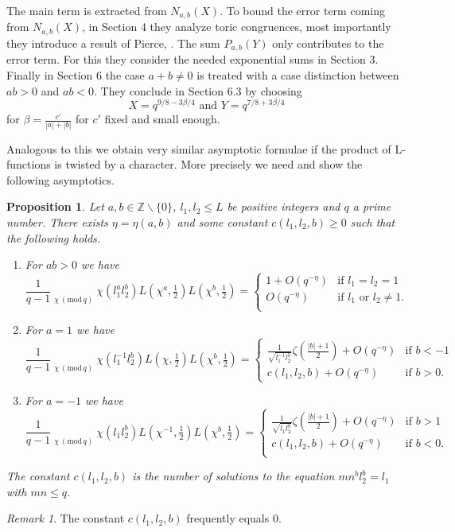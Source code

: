 \documentclass[12pt]{amsart}
\theoremstyle{plain}
\newtheorem{prop}[thm]{Proposition}
\theoremstyle{definition}
\theoremstyle{remark}
\newtheorem{rem}[thm]{Remark}
\numberwithin{equation}{section}
\newcommand{\ZZ}{\mathbb{Z}}
\newcommand\sumst{\mathop{{\sum}^\ast}\limits}
\newcommand{\mods}[1]{\,(\mathrm{mod}\,{#1})}
\renewcommand{\geq}{\geqslant}
\renewcommand{\leq}{\leqslant}
\begin{document}
The main term is extracted from $N_{a,b}(X)$. To bound the error term coming from $N_{a,b}(X)$, in Section 4 they analyze toric congruences, most importantly they introduce a result of Pierce, \cite{Pierce1}. The sum $P_{a,b}(Y)$ only contributes to the error term. For this they consider the needed exponential sums in Section 3. Finally in Section 6 the case $a+b\neq 0$ is treated with a case distinction between $ab>0$ and $ab<0$. They conclude in Section 6.3 by choosing \begin{equation}\label{eq: choice X and Y in fkm}
X=q^{9/8-3\beta/4} \text{ and }Y=q^{7/8+3\beta/4}\end{equation} 
for $\beta=\frac{c'}{|a|+|b|}$ for $c'$ fixed and small enough. 


Analogous to this we obtain very similar asymptotic formulae if the product of L-functions is twisted by a character. More precisely we need and show the following asymptotics.

\begin{prop}\label{prop: Adaptation of second moment k=0}
Let $a,b\in \ZZ\smallsetminus\{0\}$, $l_1,l_2\leq L$ be positive integers and $q$ a prime number. There exists $\eta=\eta(a,b)$ and some constant $ c(l_1,l_2,b)\geq0$ such that the following holds.
\begin{enumerate}

\item   For $ab>0$ we have 
$$    \frac{1}{q-1}\sumst_{\chi\mods q}\chi(l_1^al_2^b)L(\chi^a,\tfrac 12)L(\chi^b,\tfrac 12)=\begin{cases}
            1 +O(q^{-\eta}) &\text{if }l_1=l_2=1  \\ 
             O(q^{-\eta}) &\text{if $l_1$ or }l_2\neq1.  \\ 
        \end{cases} $$
\item For $a=1$ we have 
$$\frac{1}{q-1}\sumst_{\chi\mods q}\chi(l_1^{-1}l_2^b)L(\chi,\tfrac 12)L(\chi^b,\tfrac 12)=\begin{cases}
              \frac{1}{\sqrt{l_1^{-1}l_2^b}}\zeta\left(\frac{|b|+1}{2}\right) +O(q^{-\eta}) &\text{if }b<-1 \\ 
              c(l_1,l_2,b) +O(q^{-\eta}) &\text{if }b>0.
        \end{cases} $$
  \item  For $a=-1$ we have     
  $$\frac{1}{q-1}\sumst_{\chi\mods q}\chi(l_1l_2^b)L(\chi^{-1},\tfrac 12)L(\chi^b,\tfrac 12)=\begin{cases}
           \frac{1}{\sqrt{l_1l_2^b}} \zeta\left(\frac{|b|+1}{2}\right) +O(q^{-\eta}) &\text{if }b>1 \\ 
             c(l_1,l_2,b) +O(q^{-\eta}) &\text{if }b<0 .\\ 
        \end{cases} $$
    \end{enumerate}
The constant $ c(l_1,l_2,b)$ is the number of solutions to the equation $mn^bl_2^b=l_1$ with $mn\leq q$.
\end{prop}
\begin{rem}
    The constant $c(l_1,l_2,b)$ frequently equals 0. 
\end{rem}
\end{document}
